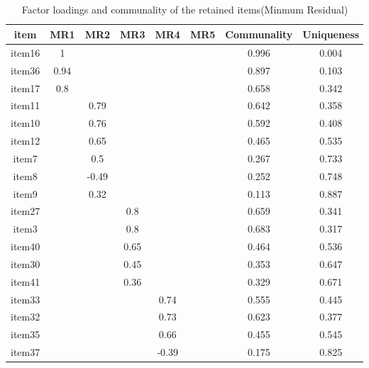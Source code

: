 \documentclass[
  english,
  man]{apa6}
\begin{document}
\endgroup


\clearpage
\makeatletter
\efloat@restorefloats
\makeatother


\begin{appendix}
\section{}
\begin{table}[tbp]

\begin{center}
\begin{threeparttable}

\caption{\label{tab:MinResTab}Factor loadings and communality of the retained items(Minmum Residual)}

\small{

\begin{tabular}{cccccccc}
\toprule
item & \multicolumn{1}{c}{MR1} & \multicolumn{1}{c}{MR2} & \multicolumn{1}{c}{MR3} & \multicolumn{1}{c}{MR4} & \multicolumn{1}{c}{MR5} & \multicolumn{1}{c}{Communality} & \multicolumn{1}{c}{Uniqueness}\\
\midrule
item16 & 1 &  &  &  &  & 0.996 & 0.004\\
item36 & 0.94 &  &  &  &  & 0.897 & 0.103\\
item17 & 0.8 &  &  &  &  & 0.658 & 0.342\\
item11 &  & 0.79 &  &  &  & 0.642 & 0.358\\
item10 &  & 0.76 &  &  &  & 0.592 & 0.408\\
item12 &  & 0.65 &  &  &  & 0.465 & 0.535\\
item7 &  & 0.5 &  &  &  & 0.267 & 0.733\\
item8 &  & -0.49 &  &  &  & 0.252 & 0.748\\
item9 &  & 0.32 &  &  &  & 0.113 & 0.887\\
item27 &  &  & 0.8 &  &  & 0.659 & 0.341\\
item3 &  &  & 0.8 &  &  & 0.683 & 0.317\\
item40 &  &  & 0.65 &  &  & 0.464 & 0.536\\
item30 &  &  & 0.45 &  &  & 0.353 & 0.647\\
item41 &  &  & 0.36 &  &  & 0.329 & 0.671\\
item33 &  &  &  & 0.74 &  & 0.555 & 0.445\\
item32 &  &  &  & 0.73 &  & 0.623 & 0.377\\
item35 &  &  &  & 0.66 &  & 0.455 & 0.545\\
item37 &  &  &  & -0.39 &  & 0.175 & 0.825\\

\end{tabular}}
\end{threeparttable}
\end{center}
\end{table}
\end{appendix}
\end{document}
